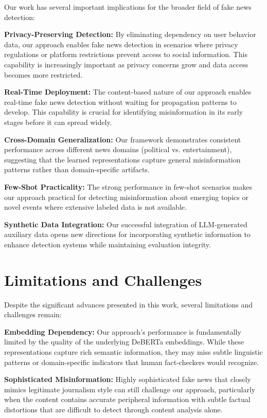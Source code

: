 Our work has several important implications for the broader field of fake news detection:

\textbf{Privacy-Preserving Detection:} By eliminating dependency on user behavior data, our approach enables fake news detection in scenarios where privacy regulations or platform restrictions prevent access to social information. This capability is increasingly important as privacy concerns grow and data access becomes more restricted.

\textbf{Real-Time Deployment:} The content-based nature of our approach enables real-time fake news detection without waiting for propagation patterns to develop. This capability is crucial for identifying misinformation in its early stages before it can spread widely.

\textbf{Cross-Domain Generalization:} Our framework demonstrates consistent performance across different news domains (political vs. entertainment), suggesting that the learned representations capture general misinformation patterns rather than domain-specific artifacts.

\textbf{Few-Shot Practicality:} The strong performance in few-shot scenarios makes our approach practical for detecting misinformation about emerging topics or novel events where extensive labeled data is not available.

\textbf{Synthetic Data Integration:} Our successful integration of LLM-generated auxiliary data opens new directions for incorporating synthetic information to enhance detection systems while maintaining evaluation integrity.

\section{Limitations and Challenges}

Despite the significant advances presented in this work, several limitations and challenges remain:

\textbf{Embedding Dependency:} Our approach's performance is fundamentally limited by the quality of the underlying DeBERTa embeddings. While these representations capture rich semantic information, they may miss subtle linguistic patterns or domain-specific indicators that human fact-checkers would recognize.

\textbf{Sophisticated Misinformation:} Highly sophisticated fake news that closely mimics legitimate journalism style can still challenge our approach, particularly when the content contains accurate peripheral information with subtle factual distortions that are difficult to detect through content analysis alone.

